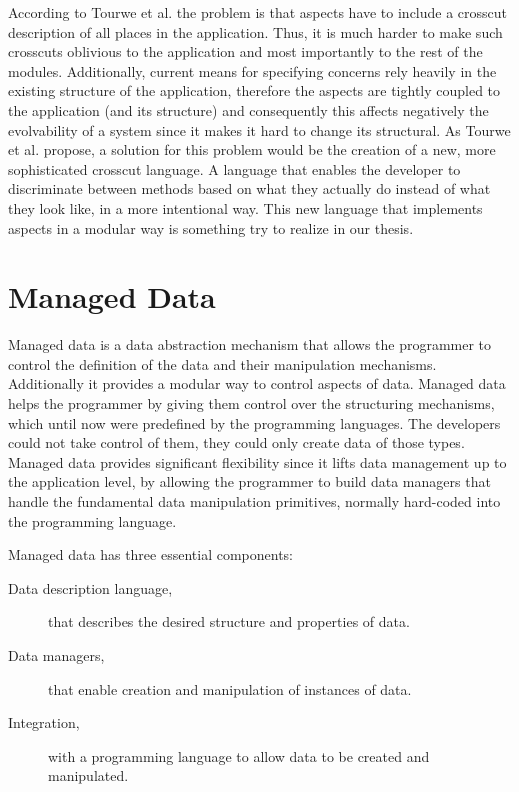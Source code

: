 According to Tourwe et al. \cite{tourwe2003existence} the problem is that aspects have to include a crosscut description of all places in the application.
Thus, it is much harder to make such crosscuts oblivious to the application and most importantly to the rest of the modules. 
Additionally, current means for specifying concerns rely heavily in the existing structure of the application, therefore the aspects are tightly coupled to the application (and its structure) and consequently this affects negatively the evolvability of a system since it makes it hard to change its structural.
As Tourwe et al. propose, a solution for this problem would be the creation of a new, more sophisticated crosscut language. 
A language that enables the developer to discriminate between methods based on what they actually do instead of what they look like, in a more intentional way.
This new language that implements aspects in a modular way is something try to realize in our thesis.

\section{Managed Data}\label{Managed Data}
Managed data \cite{loh2012managed} is a data abstraction mechanism that allows the programmer to control the definition of the data and their manipulation mechanisms. 
Additionally it provides a modular way to control aspects of data.
Managed data helps the programmer by giving them control over the structuring mechanisms, which until now were predefined by the programming languages. 
The developers could not take control of them, they could only create data of those types.
Managed data provides significant flexibility since it lifts data management up to the application level, by allowing the programmer to build data managers that handle the fundamental data manipulation primitives, normally hard-coded into the programming language. 

Managed data has three essential components:

\begin{description}
	\item [Data description language,] that describes the desired structure and properties of data.

	\item [Data managers,] that enable creation and manipulation of instances of data.

	\item [Integration,] with a programming language to allow data to be created and manipulated.
\end{description}


